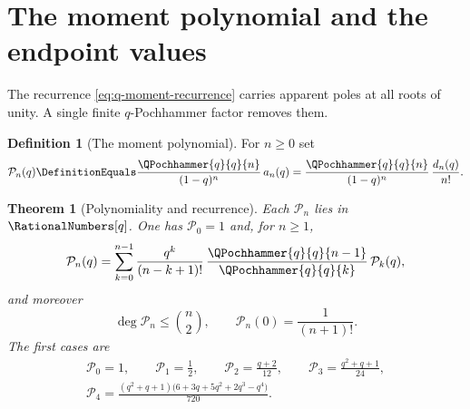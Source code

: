 \documentclass[11pt,a4paper,oneside,openany]{book}
\newtheorem{theorem}{Theorem}[chapter]
\theoremstyle{definition}
\newtheorem{definition}[definition]{Definition}
\theoremstyle{remark}
\begin{document}
\section{The moment polynomial and the endpoint values}

The recurrence \eqref{eq:q-moment-recurrence} carries apparent poles at all
roots of unity.  A single finite $q$-Pochhammer factor removes them.

\begin{definition}[The moment polynomial]\label{def:qF-moment-polynomial}
For $n\ge0$ set
\begin{equation}\label{eq:qF-moment-polynomial}
 \mathcal P_n(q)\DefinitionEquals\frac{\QPochhammer{q}{q}{n}}{(1-q)^n}\,a_n(q)
 =\frac{\QPochhammer{q}{q}{n}}{(1-q)^n}\,\frac{d_n(q)}{n!}.
\end{equation}
\end{definition}

\begin{theorem}[Polynomiality and recurrence]\label{thm:qF-moment-polynomial}
Each $\mathcal P_n$ lies in $\RationalNumbers[q]$.  One has $\mathcal P_0=1$ and, for $n\ge1$,
\begin{equation}\label{eq:qF-P-recurrence}
 \mathcal P_n(q)=\sum_{k=0}^{n-1}
 \frac{q^{k}}{(n-k+1)!}\,\frac{\QPochhammer{q}{q}{n-1}}{\QPochhammer{q}{q}{k}}\,\mathcal P_k(q),
\end{equation}
and moreover
\begin{equation}\label{eq:qF-P-degree}
 \deg\mathcal P_n\le\binom n2,
 \qquad
 \mathcal P_n(0)=\frac1{(n+1)!}.
\end{equation}
The first cases are
\begin{gather*}
 \mathcal P_0=1,\qquad
 \mathcal P_1=\frac12,\qquad
 \mathcal P_2=\frac{q+2}{12},\qquad
 \mathcal P_3=\frac{q^2+q+1}{24},\\
 \mathcal P_4=\frac{(q^2+q+1)\bigl(6+3q+5q^2+2q^3-q^4\bigr)}{720}.
\end{gather*}
\end{theorem}
\end{document}
